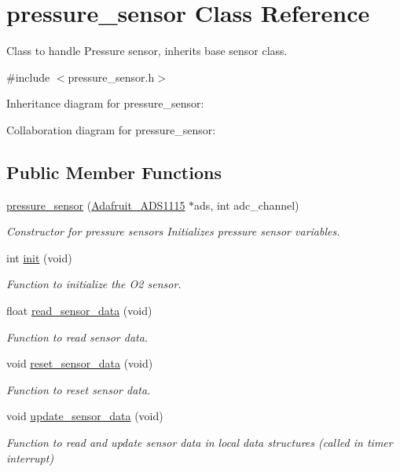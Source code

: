 \hypertarget{classpressure__sensor}{}\section{pressure\+\_\+sensor Class Reference}
\label{classpressure__sensor}


Class to handle Pressure sensor, inherits base sensor class.  




{\ttfamily \#include $<$pressure\+\_\+sensor.\+h$>$}



Inheritance diagram for pressure\+\_\+sensor\+:


Collaboration diagram for pressure\+\_\+sensor\+:
\subsection*{Public Member Functions}
\begin{DoxyCompactItemize}
\item 
\mbox{\label{classpressure__sensor_a3c60a7e473ce0057419d3c1c0c215019}} 
\hyperlink{classpressure__sensor_a3c60a7e473ce0057419d3c1c0c215019}{pressure\+\_\+sensor} (\hyperlink{class_adafruit___a_d_s1115}{Adafruit\+\_\+\+A\+D\+S1115} $\ast$ads, int adc\+\_\+channel)
\begin{DoxyCompactList}\small\item\em Constructor for pressure sensors Initializes pressure sensor variables. \end{DoxyCompactList}\item 
int \hyperlink{group___ventilator_module_ga12b267b360a27d82a85f0b5276d433ed}{init} (void)
\begin{DoxyCompactList}\small\item\em Function to initialize the O2 sensor. \end{DoxyCompactList}\item 
float \hyperlink{group___ventilator_module_ga06b5da2de0abf739405ca3c48aa0119c}{read\+\_\+sensor\+\_\+data} (void)
\begin{DoxyCompactList}\small\item\em Function to read sensor data. \end{DoxyCompactList}\item 
void \hyperlink{group___ventilator_module_ga19fa695e059a50b732d54d1e4325ee99}{reset\+\_\+sensor\+\_\+data} (void)
\begin{DoxyCompactList}\small\item\em Function to reset sensor data. \end{DoxyCompactList}\item 
void \hyperlink{group___ventilator_module_gac8d67444e99afbc866b1d759cbfde3c5}{update\+\_\+sensor\+\_\+data} (void)
\begin{DoxyCompactList}\small\item\em Function to read and update sensor data in local data structures (called in timer interrupt) \end{DoxyCompactList}\end{DoxyCompactItemize}
